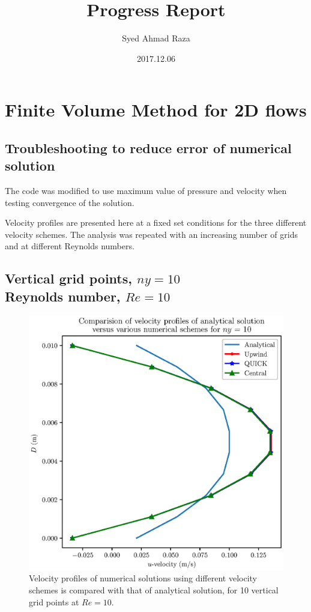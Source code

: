 \documentclass[12pt,a4paper,fleqn]{article}
\title{Progress Report}
\author{Syed Ahmad Raza}
\date{2017.12.06}
\begin{document}
\maketitle

\section{Finite Volume Method for 2D flows}

\subsection{Troubleshooting to reduce error of numerical solution}
The code was modified to use maximum value of pressure and velocity when testing convergence of the solution.

Velocity profiles are presented here at a fixed set conditions for the three different velocity schemes. The analysis was repeated with an increasing number of grids and at different Reynolds numbers.

\subsection{Vertical grid points, \(ny=10\)\\
    Reynolds number, \(Re=10\)}

\begin{figure}[H]
    \centering
    \includegraphics[width=\textwidth]{ny-10_profilesComparison.eps}
    \caption{Velocity profiles of numerical solutions using different velocity schemes is compared with that of analytical solution, for 10 vertical grid points at \(Re = 10\).}
    \label{fig:ny-10_profilesComparison}
\end{figure}
\end{document}
